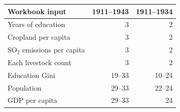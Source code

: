 \begin{tabular}{lrr}
\toprule
Workbook input & 1911--1943 & 1911--1934 \\
\midrule
Years of education & 3 & 2 \\
Cropland per capita & 3 & 2 \\
SO$_2$ emissions per capita & 3 & 2 \\
Each livestock count & 3 & 2 \\
Education Gini & 19--33 & 10--24 \\
Population & 29--33 & 22--24 \\
GDP per capita & 29--33 & 24 \\
\bottomrule
\end{tabular}
